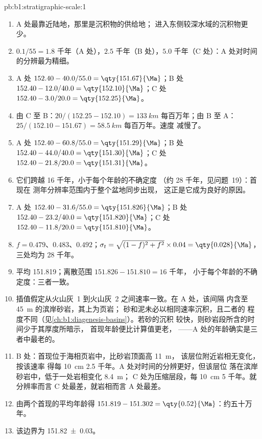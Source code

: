 \begin{solution}{pb:b1:stratigraphic-scale:1}
\begin{enumerate}
        $48.0/1.20 = \qty{40.0}{}$；C 处 $24.0/1.20 = \qty{20.0}{}$。
  \item A 处最靠近陆地，那里是沉积物的供给地；
        进入东侧较深水域的沉积物更少。
  \item $0.1/55 = \num{1.8}$ 千年（A 处），$\num{2.5}$ 千年（B 处），$\num{5.0}$
        千年（C 处）：A 处对时间的分辨最为精细。
  \item A 处 $152.40 - 40.0/55.0 = \qty{151.67}{\Ma}$；B 处 $152.40 - 12.0/40.0 =
        \qty{152.10}{\Ma}$；C 处 $152.40 - 3.0/20.0 = \qty{152.25}{\Ma}$。
  \item 由 C 至 B：$20/(152.25 - 152.10) = \qty{133}{km}$ 每百万年；由 B 至 A：
        $25/(152.10 - 151.67) = \qty{58.5}{km}$ 每百万年。速度
        减慢了。
  \item A 处 $152.40 - 60.8/55.0 = \qty{151.29}{\Ma}$；B 处 $152.40 - 44.0/40.0 =
        \qty{151.30}{\Ma}$；C 处 $152.40 - 21.8/20.0 = \qty{151.31}{\Ma}$。
  \item 它们跨越 \num{16} 千年，小于每个年龄的不确定度
        （约 \num{28} 千年，见问题~19）：首现在
        测年分辨率范围内于整个盆地同步出现，
        这正是它成为良好的原因。
  \item A 处 $152.40 - 31.6/55.0 = \qty{151.826}{\Ma}$；B 处 $152.40 - 23.2/40.0 =
        \qty{151.820}{\Ma}$；C 处 $152.40 - 11.8/20.0 = \qty{151.810}{\Ma}$。
  \item $f = 0.479$、$0.483$、$0.492$；$\sigma_t = \sqrt{(1 - f)^2 + f^2} \times
        0.04 = \qty{0.028}{\Ma}$，三处均为 \num{28} 千年。
  \item 平均 \qty{151.819}{\Ma}；离散范围 $151.826 - 151.810 = \num{16}$ 千年，
        小于每个年龄的不确定度：三者一致。
  \item 插值假定从火山灰~1 到火山灰~2 之间速率一致。在 A 处，该间隔
        内含至 \qty{45}{m} 的滨岸砂岩，其上为页岩；
        砂和泥未必以相同速率沉积，且二者的
        程度不同（见\cref{ch:b1:diagenesis-basins}）。若砂的沉积
        较快，则砂岩段所含的时间少于其厚度所暗示，
        首现年龄便比计算值更老，
——A 处的年龄确实是三者中最老的。
  \item B 处：首现位于海相页岩中，比砂岩顶面高 \qty{11}{m}，
        该层位附近岩相无变化，按该速率
        得每 \qty{10}{cm} \num{2.5} 千年。A 处对时间的分辨更好，但该层位
        落在滨岸砂岩中，低于一处岩相变化 \qty{8.4}{m}；
        C 处为压缩层段，每
        \qty{10}{cm} \num{5} 千年。就分辨率而言 C 处最差，就岩相而言 A 处最差。
  \item 由两个首现的平均年龄得 $151.819 - 151.302 =
        \qty{0.52}{\Ma}$：约五十万年。
  \item 该边界为 \qty[uncertainty-mode=separate]{151.82(3)}{\Ma}。
\end{enumerate}
\end{solution}
